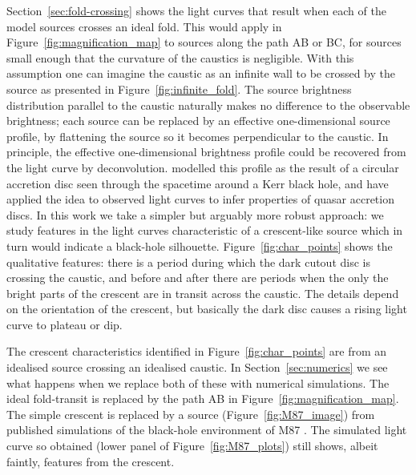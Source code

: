 Section~\ref{sec:fold-crossing} shows the light curves that result
when each of the model sources crosses an ideal fold.  This would
apply in Figure~\ref{fig:magnification_map} to sources along the path
AB or BC, for sources small enough that the curvature of the caustics
is negligible.  With this assumption one can imagine the caustic as an
infinite wall to be crossed by the source as presented in
Figure~\ref{fig:infinite_fold}.  The source brightness distribution
parallel to the caustic naturally makes no difference to the
observable brightness; each source can be replaced by an effective
one-dimensional source profile, by flattening the source so it becomes
perpendicular to the caustic.  In principle, the effective
one-dimensional brightness profile could be recovered from the light
curve by deconvolution.  \cite{1999ApJ...524...49A} modelled this
profile as the result of a circular accretion disc seen through the
spacetime around a Kerr black hole, and \cite{2012MNRAS.423..676A}
have applied the idea to observed light curves to infer properties of
quasar accretion discs.  In this work we take a simpler but arguably
more robust approach: we study features in the light curves
characteristic of a crescent-like source which in turn would indicate
a black-hole silhouette.  Figure~\ref{fig:char_points} shows the
qualitative features: there is a period during which the dark cutout
disc is crossing the caustic, and before and after there are periods
when the only the bright parts of the crescent are in transit across
the caustic.  The details depend on the orientation of the crescent,
but basically the dark disc causes a rising light curve to plateau or
dip.

The crescent characteristics identified in
Figure~\ref{fig:char_points} are from an idealised source crossing an
idealised caustic.  In Section~\ref{sec:numerics} we see what happens
when we replace both of these with numerical simulations.  The ideal
fold-transit is replaced by the path AB in
Figure~\ref{fig:magnification_map}.  The simple crescent is replaced
by a source (Figure~\ref{fig:M87_image}) from published simulations of
the black-hole environment of M87
\citep{2009MNRAS.394L.126M,2012MNRAS.421.1517D}.  The simulated light
curve so obtained (lower panel of Figure~\ref{fig:M87_plots}) still
shows, albeit faintly, features from the crescent.

